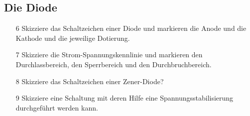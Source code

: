 \subsection*{Die Diode}

\begin{enumerate}
\itemsep1pt\parskip0pt
\item[6] Skizziere das Schaltzeichen einer Diode und markieren die Anode und die Kathode und die jeweilige Dotierung.
\item[7] Skizziere die Strom-Spannungskennlinie und markieren den Durchlassbereich, den Sperrbereich und den Durchbruchbereich.
\item[8] Skizziere das Schaltzeichen einer Zener-Diode?
\item[9] Skizziere eine Schaltung mit deren Hilfe eine Spannungsstabilisierung durchgeführt werden kann.
\end{enumerate}


